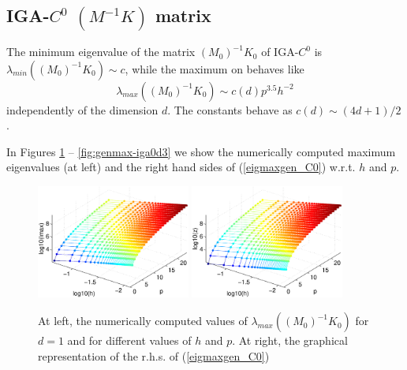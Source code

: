 \documentclass[11pt]{article}
\begin{document}
\clearpage
\newpage
\subsection{IGA-$C^0$ $(M^{-1}K)$ matrix}

The minimum eigenvalue of the                  
matrix $(M_0)^{-1}K_0$ of IGA-$C^0$
is  $\lambda_{min}((M_0)^{-1}K_0)\sim c$,
while the maximum on behaves like
\begin{equation} \label{eigmaxgen_C0}
\lambda_{max}((M_0)^{-1}K_0)\sim c(d) p^{3.5}h^{-2}
\end{equation}
independently of the dimension $d$. 
The constants behave as $c(d)\sim (4d+1)/2$.

In Figures \ref{fig:genmax-iga0d1} -- \ref{fig:genmax-iga0d3} we show
the numerically computed maximum eigenvalues (at left) and the right hand sides of
(\ref{eigmaxgen_C0}) w.r.t. $h$ and $p$. 

\begin{figure}[h]
\begin{center}
\includegraphics[width=0.45\textwidth]{Images/iga0_eiggen1max.eps}\quad
\includegraphics[width=0.45\textwidth]{Images/iga0_eiggen1smax.eps}
\end{center}
\caption{At left, the numerically computed values of
$\lambda_{max}((M_0)^{-1}K_0)$ for $d=1$ and
for different values of $h$ and $p$. At right,
the graphical representation of the r.h.s. of (\ref{eigmaxgen_C0})}
\label{fig:genmax-iga0d1}
\end{figure}
\end{document}
